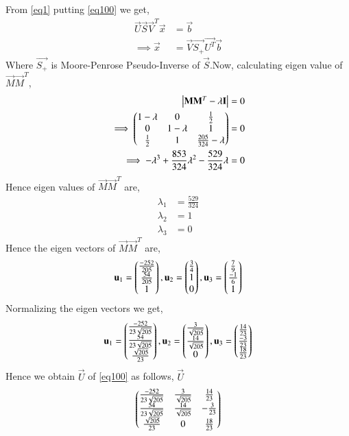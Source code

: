 \documentclass[journal,12pt,twocolumn]{IEEEtran}
\begin{document}
From \eqref{eq1} putting \eqref{eq100} we get,
\begin{align}\label{eqX}
\vec{U}\vec{S}\vec{V}^T\vec{x} & = \vec{b}\\
\implies\vec{x} &= \vec{V}\vec{S_+}\vec{U^T}\vec{b}
\end{align}
Where $\vec{S_+}$ is Moore-Penrose Pseudo-Inverse of $\vec{S}$.Now, calculating eigen value of $\vec{M}\vec{M}^T$,
\begin{align}
\begin{vmatrix}\mathbf{M}\mathbf{M}^T - \lambda\mathbf{I}\end{vmatrix} &= 0\\
\implies\begin{pmatrix}1-\lambda&0&\frac{1}{2}\\0&1-\lambda&1\\\frac{1}{2}&1&\frac{205}{324}-\lambda\end{pmatrix} &=0\\
\implies-\lambda^3+\frac{853}{324} \lambda^2-\frac{529}{324}\lambda &=0
\end{align}
Hence eigen values of $\vec{M}\vec{M}^T$ are,
\begin{align}
\lambda_1 &=\frac{529}{324}\\
\lambda_2 &= 1\\
\lambda_3 &=0
\end{align}
Hence the eigen vectors of $\vec{M}\vec{M}^T$ are,
\begin{align}
\mathbf{u}_1=\begin{pmatrix}\frac{-252}{205}\\\frac{54}{205}\\1\end{pmatrix},
\mathbf{u}_2=\begin{pmatrix}\frac{3}{4}\\1\\0\end{pmatrix},
\mathbf{u}_3=\begin{pmatrix}\frac{7}{9}\\\frac{-1}{6}\\1\end{pmatrix}
\end{align}
Normalizing the eigen vectors we get,
\begin{align}
\mathbf{u}_1=\begin{pmatrix}\frac{-252}{23\sqrt{205}}\\\frac{54}{23\sqrt{205}}\\\frac{\sqrt{205}}{{23}}\end{pmatrix},
\mathbf{u}_2=\begin{pmatrix}\frac{3}{\sqrt{205}}\\\frac{14}{\sqrt{205}}\\0\end{pmatrix},
\mathbf{u}_3=\begin{pmatrix}\frac{14}{23}\\\frac{-3}{23}\\\frac{18}{23}\end{pmatrix}
\end{align}
Hence we obtain $\vec{U}$ of \eqref{eq100} as follows,
 $\vec{U}$\begin{align}\label{eqU}
\begin{pmatrix}\frac{-252}{23\sqrt{205}}& \frac{3}{\sqrt{205}}&\frac{14}{23}\\
\frac{54}{23\sqrt{205}}&\frac{14}{\sqrt{205}}&-\frac{3}{23}\\
\frac{\sqrt{205}}{{23}}&0&\frac{18}{23}\end{pmatrix}
\end{align}
\end{document}

